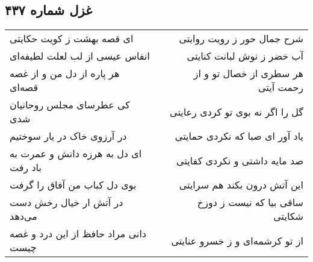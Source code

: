 \begin{center}
\section*{غزل شماره ۴۳۷}
\label{sec:sh437}
\begin{longtable}{l p{0.5cm} r}
ای قصه بهشت ز کویت حکایتی
&&
شرح جمال حور ز رویت روایتی
\\
انفاس عیسی از لب لعلت لطیفه‌ای
&&
آب خضر ز نوش لبانت کنایتی
\\
هر پاره از دل من و از غصه قصه‌ای
&&
هر سطری از خصال تو و از رحمت آیتی
\\
کی عطرسای مجلس روحانیان شدی
&&
گل را اگر نه بوی تو کردی رعایتی
\\
در آرزوی خاک در یار سوختیم
&&
یاد آور ای صبا که نکردی حمایتی
\\
ای دل به هرزه دانش و عمرت به باد رفت
&&
صد مایه داشتی و نکردی کفایتی
\\
بوی دل کباب من آفاق را گرفت
&&
این آتش درون بکند هم سرایتی
\\
در آتش ار خیال رخش دست می‌دهد
&&
ساقی بیا که نیست ز دوزخ شکایتی
\\
دانی مراد حافظ از این درد و غصه چیست
&&
از تو کرشمه‌ای و ز خسرو عنایتی
\\
\end{longtable}
\end{center}
